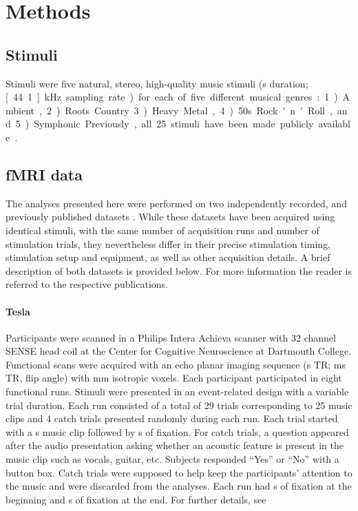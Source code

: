\section*{Methods}

\subsection*{Stimuli}

Stimuli were five natural, stereo, high-quality music stimuli (\unit[6]{s} duration; \unit[44.1]{kHz} sampling rate) for each of five different musical genres: 1) Ambient, 2) Roots Country 3) Heavy Metal, 4) 50s Rock'n'Roll, and 5) Symphonic. Previously, all 25 stimuli have been made publicly available \citep{HDH+2015}.

\subsection*{f{MRI} data}

The analyses presented here were performed on two independently recorded, and previously published datasets \citep{CTK+2012,HDH+2015}. While these datasets have been acquired using identical stimuli, with the same number of acquisition runs and number of stimulation trials, they nevertheless differ in their precise stimulation timing, stimulation setup and equipment, as well as other acquisition details. A brief description of both datasets is provided below. For more information the reader is referred to the respective publications.

\paragraph{\unit[3]{Tesla}}
%
Participants were scanned in a Philips Intera Achieva scanner with 32 channel SENSE head coil at the Center for Cognitive Neuroscience at Dartmouth College. Functional scans were acquired with an echo planar imaging sequence (\unit[2]{s} TR; \unit[35]{ms} TR, \unit[90]{\textdegree} flip angle) with \unit[3]{mm} isotropic voxels.
Each participant participated in eight functional runs. Stimuli were presented in an event-related design with a variable trial duration. Each run consisted of a total of 29 trials corresponding to 25 music clips and 4 catch trials presented randomly during each run. Each trial started with a \unit[6]{s} music clip followed by \unit[4-8]{s} of fixation. For catch trials, a question appeared after the audio presentation asking whether an acoustic feature is present in the music clip such as vocals, guitar, etc. Subjects responded “Yes” or “No” with a button box. Catch trials were supposed to help keep the participants’ attention to the music and were discarded from the analyses. Each run had \unit[4]{s} of fixation at the beginning and \unit[10]{s} of fixation at the end. For further details, see \citet{CTK+2012}

